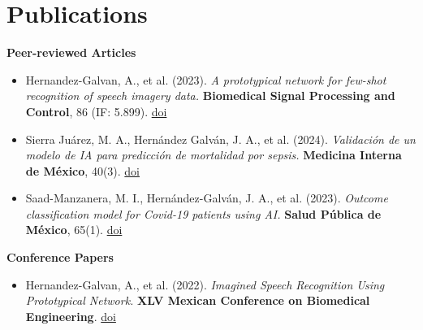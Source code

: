 \section*{Publications}

\textbf{Peer-reviewed Articles}
\begin{itemize}
    \item Hernandez-Galvan, A., et al. (2023). \textit{A prototypical network for few-shot recognition of speech imagery data.} \textbf{Biomedical Signal Processing and Control}, 86 (IF: 5.899). \href{https://doi.org/10.1016/j.bspc.2023.105154}{doi}
  \item Sierra Juárez, M. A., Hernández Galván, J. A., et al. (2024). \textit{Validación de un modelo de IA para predicción de mortalidad por sepsis.} \textbf{Medicina Interna de México}, 40(3). \href{https://doi.org/10.24245/mim.v40i3.9023}{doi}
  \item Saad-Manzanera, M. I., Hernández-Galván, J. A., et al. (2023). \textit{Outcome classification model for Covid-19 patients using AI.} \textbf{Salud Pública de México}, 65(1). \href{https://doi.org/10.21149/13547}{doi}
\end{itemize}

\textbf{Conference Papers}
\begin{itemize}
  \item Hernandez-Galvan, A., et al. (2022). \textit{Imagined Speech Recognition Using Prototypical Network.} \textbf{XLV Mexican Conference on Biomedical Engineering}. \href{https://doi.org/10.1007/978-3-031-18256-3_4}{doi}
\end{itemize}
